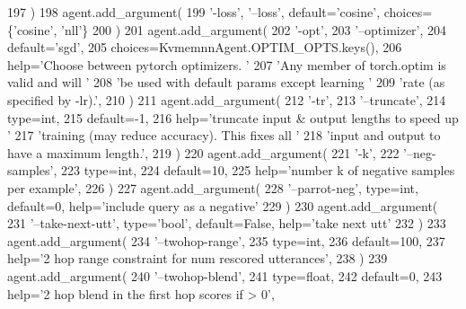 \begin{DoxyCode}
197         )
198         agent.add\_argument(
199             \textcolor{stringliteral}{'-loss'}, \textcolor{stringliteral}{'--loss'}, default=\textcolor{stringliteral}{'cosine'}, choices=\{\textcolor{stringliteral}{'cosine'}, \textcolor{stringliteral}{'nll'}\}
200         )
201         agent.add\_argument(
202             \textcolor{stringliteral}{'-opt'},
203             \textcolor{stringliteral}{'--optimizer'},
204             default=\textcolor{stringliteral}{'sgd'},
205             choices=KvmemnnAgent.OPTIM\_OPTS.keys(),
206             help=\textcolor{stringliteral}{'Choose between pytorch optimizers. '}
207             \textcolor{stringliteral}{'Any member of torch.optim is valid and will '}
208             \textcolor{stringliteral}{'be used with default params except learning '}
209             \textcolor{stringliteral}{'rate (as specified by -lr).'},
210         )
211         agent.add\_argument(
212             \textcolor{stringliteral}{'-tr'},
213             \textcolor{stringliteral}{'--truncate'},
214             type=int,
215             default=-1,
216             help=\textcolor{stringliteral}{'truncate input & output lengths to speed up '}
217             \textcolor{stringliteral}{'training (may reduce accuracy). This fixes all '}
218             \textcolor{stringliteral}{'input and output to have a maximum length.'},
219         )
220         agent.add\_argument(
221             \textcolor{stringliteral}{'-k'},
222             \textcolor{stringliteral}{'--neg-samples'},
223             type=int,
224             default=10,
225             help=\textcolor{stringliteral}{'number k of negative samples per example'},
226         )
227         agent.add\_argument(
228             \textcolor{stringliteral}{'--parrot-neg'}, type=int, default=0, help=\textcolor{stringliteral}{'include query as a negative'}
229         )
230         agent.add\_argument(
231             \textcolor{stringliteral}{'--take-next-utt'}, type=\textcolor{stringliteral}{'bool'}, default=\textcolor{keyword}{False}, help=\textcolor{stringliteral}{'take next utt'}
232         )
233         agent.add\_argument(
234             \textcolor{stringliteral}{'--twohop-range'},
235             type=int,
236             default=100,
237             help=\textcolor{stringliteral}{'2 hop range constraint for num rescored utterances'},
238         )
239         agent.add\_argument(
240             \textcolor{stringliteral}{'--twohop-blend'},
241             type=float,
242             default=0,
243             help=\textcolor{stringliteral}{'2 hop blend in the first hop scores if > 0'},

\end{DoxyCode}
